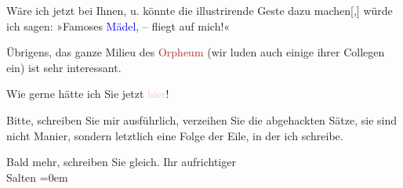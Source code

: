 \pstart
           Wäre ich jetzt bei Ihnen, u. könnte die illustrirende Geste dazu
                  machen{[},{]} würde ich sagen: »Famoses \textcolor{blue}{Mädel}{}\ledrightnote{{$\rightarrow$}\textcolor{blue}{Paula Makay}}, – fliegt \label{K_L03103-2v}\label{K_L03103-2h} auf mich!«\pend
           
\pstart
           Übrigens, das ganze Milieu des \textcolor{brown}{Orpheum}{}\ledrightnote{\textcolor{brown}{Danzer’s Orpheum}} (wir luden
               auch einige ihrer Collegen ein) ist sehr interessant.\pend
           
\pstart
           Wie gerne hätte ich Sie jetzt \textcolor{pink}{hier}{}\ledrightnote{{$\rightarrow$}\textcolor{pink}{Miskolc}}!\pend
           
\pstart
           Bitte, schreiben Sie mir ausführlich, verzeihen Sie die abgehackten Sätze, sie sind
               nicht Manier, sondern letztlich eine Folge der Eile, in der ich schreibe.\pend
           
\pstart
           Bald mehr, schreiben Sie gleich. Ihr aufrichtiger {\\[\baselineskip]}\spacefill\mbox{Salten}\pend
           \leftskip=0em{}\endnumbering{}  
      